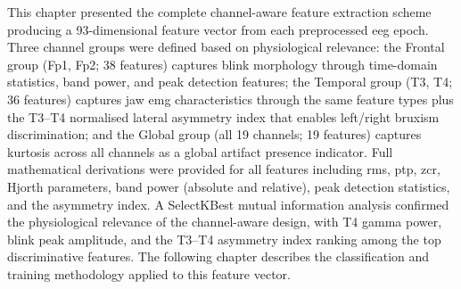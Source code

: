 This chapter presented the complete channel-aware feature
extraction scheme producing a 93-dimensional feature vector
from each preprocessed \acrshort{eeg} epoch. Three channel
groups were defined based on physiological relevance: the
Frontal group (Fp1, Fp2; 38 features) captures blink
morphology through time-domain statistics, band power, and
peak detection features; the Temporal group (T3, T4; 36
features) captures jaw \acrshort{emg} characteristics
through the same feature types plus the T3--T4 normalised
lateral asymmetry index that enables left/right bruxism
discrimination; and the Global group (all 19 channels;
19 features) captures kurtosis across all channels as
a global artifact presence indicator. Full mathematical
derivations were provided for all features including
\acrshort{rms}, \acrshort{ptp}, \acrshort{zcr}, Hjorth
parameters, band power (absolute and relative), peak
detection statistics, and the asymmetry index. A
SelectKBest mutual information analysis confirmed the
physiological relevance of the channel-aware design,
with T4 gamma power, blink peak amplitude, and the
T3--T4 asymmetry index ranking among the top
discriminative features. The following chapter describes
the classification and training methodology applied to
this feature vector.